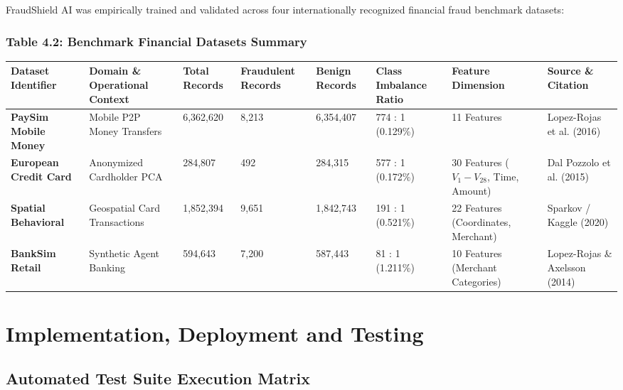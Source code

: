 \documentclass[12pt,a4paper,oneside]{report}
\begin{document}
FraudShield AI was empirically trained and validated across four internationally recognized financial fraud benchmark datasets:


\subsubsection{Table 4.2: Benchmark Financial Datasets Summary}

\begin{table}[H]
\centering
\footnotesize
\begin{adjustbox}{width=\textwidth,center}
\begin{tabular}{| l | l | l | l | l | l | l | l |}
\hline
\rowcolor{tableheader} \textbf{Dataset Identifier} & \textbf{Domain \& Operational Context} & \textbf{Total Records} & \textbf{Fraudulent Records} & \textbf{Benign Records} & \textbf{Class Imbalance Ratio} & \textbf{Feature Dimension} & \textbf{Source \& Citation} \\ \hline
\textbf{PaySim Mobile Money} & Mobile P2P Money Transfers & 6,362,620 & 8,213 & 6,354,407 & 774 : 1 (0.129\%) & 11 Features & Lopez-Rojas et al. (2016) \\ \hline
\rowcolor{tablealt} \textbf{European Credit Card} & Anonymized Cardholder PCA & 284,807 & 492 & 284,315 & 577 : 1 (0.172\%) & 30 Features ($V_1-V_{28}$, Time, Amount) & Dal Pozzolo et al. (2015) \\ \hline
\textbf{Spatial Behavioral} & Geospatial Card Transactions & 1,852,394 & 9,651 & 1,842,743 & 191 : 1 (0.521\%) & 22 Features (Coordinates, Merchant) & Sparkov / Kaggle (2020) \\ \hline
\rowcolor{tablealt} \textbf{BankSim Retail} & Synthetic Agent Banking & 594,643 & 7,200 & 587,443 & 81 : 1 (1.211\%) & 10 Features (Merchant Categories) & Lopez-Rojas \& Axelsson (2014) \\ \hline
\end{tabular}
\end{adjustbox}
\end{table}


\section{Implementation, Deployment and Testing}

\subsection{Automated Test Suite Execution Matrix}
\end{document}
